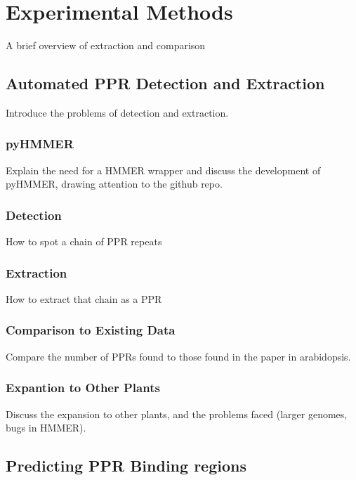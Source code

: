 
\chapter{Experimental Methods} 
\label{chap:methods}

A brief overview of extraction and comparison

\section{Automated PPR Detection and Extraction}
\label{sec:ppr_extraction}

Introduce the problems of detection and extraction.

\subsection{pyHMMER}
\label{ssec:pyHMMER}

Explain the need for a HMMER wrapper and discuss the development of pyHMMER,
drawing attention to the github repo.

\subsection{Detection}
\label{ssec:Detection}

How to spot a chain of PPR repeats

\subsection{Extraction}
\label{sseq:extraction}

How to extract that chain as a PPR

\subsection{Comparison to Existing Data}
\label{sseq:comparison}

Compare the number of PPRs found to those found in the paper in arabidopsis.

\subsection{Expantion to Other Plants}
\label{ssec:pprs_other}

Discuss the expansion to other plants, and the problems faced (larger genomes,
bugs in HMMER).

\section{Predicting PPR Binding regions}
\label{sec:ppr_binding}

